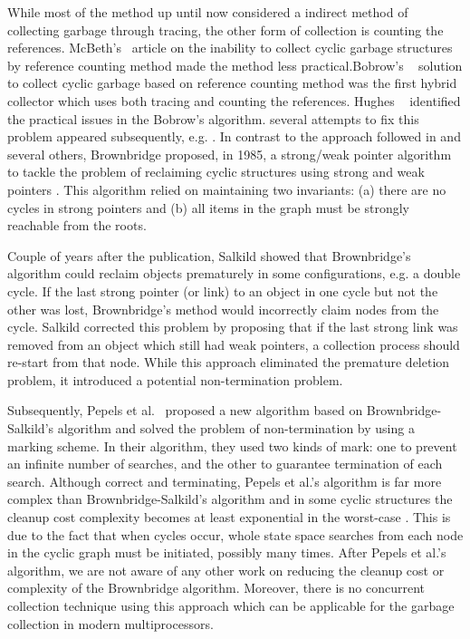  While most of the method up until now considered a indirect method of collecting garbage through tracing, the other form of collection is counting the references. McBeth's~\cite{McBeth1963} article on the inability to collect cyclic garbage structures by 
 reference counting method made the method less practical.Bobrow's ~\cite{Bobrow1980} solution to collect cyclic garbage based on reference counting method was the first hybrid collector which uses both tracing and
counting the references. Hughes ~\cite{hugh83,hugh87} identified the practical issues in the Bobrow's algorithm.
several attempts to fix this problem appeared subsequently, e.g. \cite{Friedman1979,Bobrow1980,Lins2008}. 
In contrast to the approach followed in \cite{Friedman1979,Bobrow1980,Lins2008} and several others,
Brownbridge \cite{Brownbridge1985} proposed, in 1985, a strong/weak pointer algorithm to tackle the problem of reclaiming cyclic  structures using strong and weak pointers \cite{Jones1996}. 
This algorithm relied on maintaining two invariants: (a) there are no cycles in strong pointers and (b) all items in the graph must be strongly reachable from the roots.

Couple of years after the publication, Salkild \cite{Salkild1987} showed that Brownbridge's algorithm
\cite{Brownbridge1985} could reclaim objects prematurely in some
configurations, e.g. a double cycle. If the last strong pointer (or link) to
an object in one cycle but not the other was lost, Brownbridge's
method would incorrectly claim nodes from the cycle.
Salkild \cite{Salkild1987} corrected this problem by proposing
that if the last strong link was removed from an object which still
had weak pointers, a collection process should re-start from that node.
While this approach eliminated the premature deletion problem, it introduced a
potential non-termination problem.

Subsequently, Pepels et al.~\cite{Pepels1988} proposed a new algorithm based on
Brownbridge-Salkild's algorithm and solved the problem of non-termination by
using a marking scheme. In their algorithm, they used two kinds of mark: one to
prevent an infinite number of searches, and the other to guarantee termination
of each search. Although correct and terminating, Pepels et al.'s algorithm is far more
complex than Brownbridge-Salkild's algorithm and in some cyclic structures the
cleanup cost complexity becomes at least
exponential in the worst-case \cite{Jones1996}. This is due to the fact that when
cycles occur, whole state space searches from
each node in the cyclic graph must be initiated, possibly many times. After Pepels et al.'s algorithm, we are not aware
of any other work on reducing the cleanup cost or complexity of the Brownbridge
algorithm. Moreover, there is no concurrent collection technique using this approach which can be applicable for the garbage collection in modern multiprocessors.

